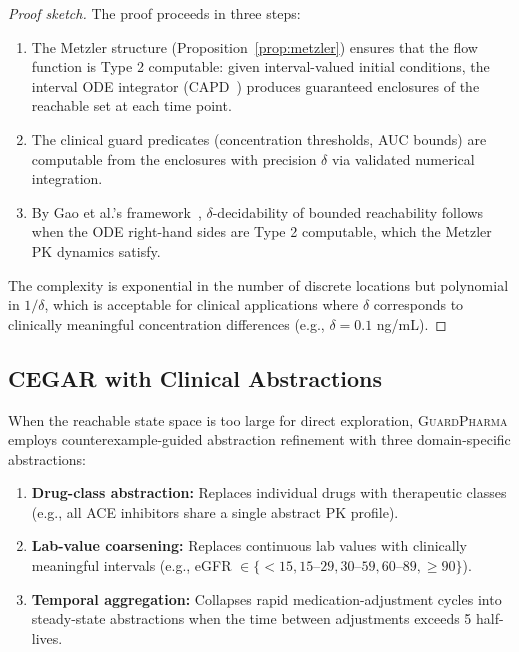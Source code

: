 \documentclass{article}
\theoremstyle{definition}
\begin{document}
\begin{proof}[Proof sketch]
The proof proceeds in three steps:
\begin{enumerate}
\item The Metzler structure (Proposition~\ref{prop:metzler}) ensures that the flow function is Type 2 computable: given interval-valued initial conditions, the interval ODE integrator (CAPD~\cite{capd}) produces guaranteed enclosures of the reachable set at each time point.
\item The clinical guard predicates (concentration thresholds, AUC bounds) are computable from the enclosures with precision $\delta$ via validated numerical integration.
\item By Gao et al.'s framework~\cite{gao2013delta}, $\delta$-decidability of bounded reachability follows when the ODE right-hand sides are Type 2 computable, which the Metzler PK dynamics satisfy.
\end{enumerate}
The complexity is exponential in the number of discrete locations but polynomial in $1/\delta$, which is acceptable for clinical applications where $\delta$ corresponds to clinically meaningful concentration differences (e.g., $\delta = 0.1$ ng/mL).
\end{proof}

\subsection{CEGAR with Clinical Abstractions}

When the reachable state space is too large for direct exploration, \textsc{GuardPharma} employs counterexample-guided abstraction refinement with three domain-specific abstractions:

\begin{enumerate}
\item \textbf{Drug-class abstraction:} Replaces individual drugs with therapeutic classes (e.g., all ACE inhibitors share a single abstract PK profile).
\item \textbf{Lab-value coarsening:} Replaces continuous lab values with clinically meaningful intervals (e.g., eGFR $\in \{<15, 15$--$29, 30$--$59, 60$--$89, \geq 90\}$).
\item \textbf{Temporal aggregation:} Collapses rapid medication-adjustment cycles into steady-state abstractions when the time between adjustments exceeds 5 half-lives.
\end{enumerate}

\end{document}
